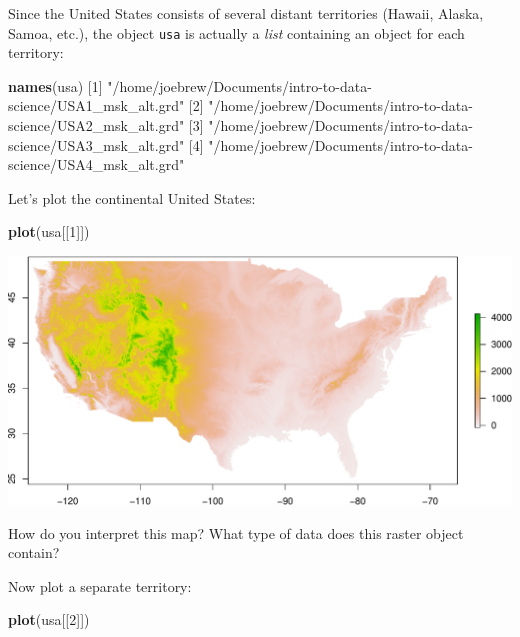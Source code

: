 \documentclass[]{book}
\newenvironment{Shaded}{\begin{snugshade}}{\end{snugshade}}
\newcommand{\DecValTok}[1]{\textcolor[rgb]{0.00,0.00,0.81}{#1}}
\newcommand{\KeywordTok}[1]{\textcolor[rgb]{0.13,0.29,0.53}{\textbf{#1}}}
\newcommand{\NormalTok}[1]{#1}
\newcommand{\StringTok}[1]{\textcolor[rgb]{0.31,0.60,0.02}{#1}}
\begin{document}
Since the United States consists of several distant territories (Hawaii, Alaska, Samoa, etc.), the object \texttt{usa} is actually a \emph{list} containing an object for each territory:

\begin{Shaded}
\begin{Highlighting}[]
\KeywordTok{names}\NormalTok{(usa)}
\NormalTok{[}\DecValTok{1}\NormalTok{] }\StringTok{"/home/joebrew/Documents/intro-to-data-science/USA1_msk_alt.grd"}
\NormalTok{[}\DecValTok{2}\NormalTok{] }\StringTok{"/home/joebrew/Documents/intro-to-data-science/USA2_msk_alt.grd"}
\NormalTok{[}\DecValTok{3}\NormalTok{] }\StringTok{"/home/joebrew/Documents/intro-to-data-science/USA3_msk_alt.grd"}
\NormalTok{[}\DecValTok{4}\NormalTok{] }\StringTok{"/home/joebrew/Documents/intro-to-data-science/USA4_msk_alt.grd"}
\end{Highlighting}
\end{Shaded}

Let's plot the continental United States:

\begin{Shaded}
\begin{Highlighting}[]
\KeywordTok{plot}\NormalTok{(usa[[}\DecValTok{1}\NormalTok{]])}
\end{Highlighting}
\end{Shaded}

\includegraphics{figures/unnamed-chunk-639-1.pdf}

How do you interpret this map? What type of data does this raster object contain?

Now plot a separate territory:

\begin{Shaded}
\begin{Highlighting}[]
\KeywordTok{plot}\NormalTok{(usa[[}\DecValTok{2}\NormalTok{]])}
\end{Highlighting}
\end{Shaded}
\end{document}
